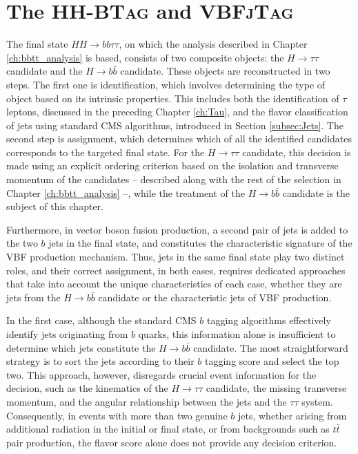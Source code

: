 \chapter{The \textsc{HH-BTag} and \textsc{VBFjTag}}
\label{ch:taggers}
%
The final state $HH\rightarrow bb\tau\tau$, on which the analysis described in Chapter \ref{ch:bbtt_analysis} is based, consists of two composite objects: the $H\rightarrow\tau\tau$ candidate and the $H\rightarrow b\bar{b}$ candidate. These objects are reconstructed in two steps. The first one is identification, which involves determining the type of object based on its intrinsic properties. This includes both the identification of $\tau$ leptons, discussed in the preceding Chapter \ref{ch:Tau}, and the flavor classification of jets using standard CMS algorithms, introduced in Section \ref{subsec:Jets}. The second step is assignment, which determines which of all the identified candidates corresponds to the targeted final state. For the $H\rightarrow\tau\tau$ candidate, this decision is made using an explicit ordering criterion based on the isolation and transverse momentum of the candidates -- described along with the rest of the selection in Chapter \ref{ch:bbtt_analysis} --, while the treatment of the $H\rightarrow b\bar{b}$ candidate is the subject of this chapter.

Furthermore, in vector boson fusion production, a second pair of jets is added to the two $b$ jets in the final state, and constitutes the characteristic signature of the VBF production mechanism. Thus, jets in the same final state play two distinct roles, and their correct assignment, in both cases, requires dedicated approaches that take into account the unique characteristics of each case, whether they are jets from the $H\rightarrow b\bar{b}$ candidate or the characteristic jets of VBF production.

In the first case, although the standard CMS $b$ tagging algorithms effectively identify jets originating from $b$ quarks, this information alone is insufficient to determine which jets constitute the $H\rightarrow b\bar{b}$ candidate. The most straightforward strategy is to sort the jets according to their $b$ tagging score and select the top two. This approach, however, disregards crucial event information for the decision, such as the kinematics of the $H\rightarrow\tau\tau$ candidate, the missing transverse momentum, and the angular relationship between the jets and the $\tau\tau$ system. Consequently, in events with more than two genuine $b$ jets, whether arising from additional radiation in the initial or final state, or from backgrounds such as $t\bar{t}$ pair production, the flavor score alone does not provide any decision criterion.

